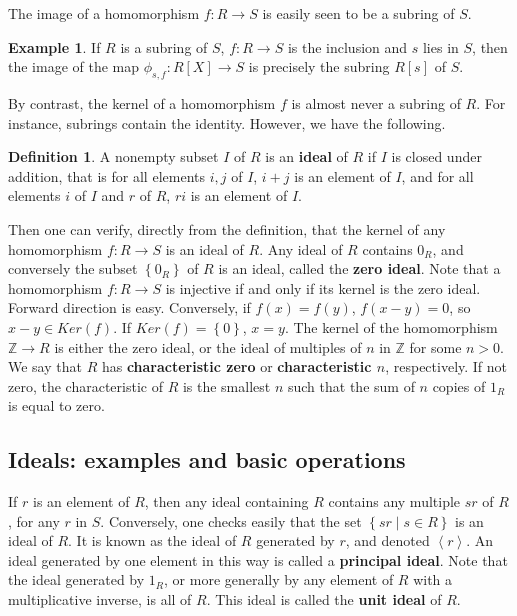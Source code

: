 \documentclass{article}
\newcommand{\Z}{\mathbb{Z}}
\newcommand{\rb}[1]{\left( #1 \right)}
\renewcommand{\sb}[1]{\left[ #1 \right]}
\newcommand{\cb}[1]{\left\{ #1 \right\}}
\newcommand{\ab}[1]{\left\langle #1 \right\rangle}
\theoremstyle{definition}\newtheorem{definition}{Definition}[subsection]
\theoremstyle{definition}\newtheorem{remark}[definition]{Remark}
\theoremstyle{definition}\newtheorem*{example}{Example}
\theoremstyle{definition}\newtheorem*{note}{Note}
\begin{document}
The image of a homomorphism $ f : R \to S $ is easily seen to be a subring of $ S $.

\begin{example}
If $ R $ is a subring of $ S $, $ f : R \to S $ is the inclusion and $ s $ lies in $ S $, then the image of the map $ \phi_{s, f} : R\sb{X} \to S $ is precisely the subring $ R\sb{s} $ of $ S $.
\end{example}

By contrast, the kernel of a homomorphism $ f $ is almost never a subring of $ R $. For instance, subrings contain the identity. However, we have the following.


\begin{definition}
A nonempty subset $ I $ of $ R $ is an \textbf{ideal} of $ R $ if $ I $ is closed under addition, that is for all elements $ i, j $ of $ I $, $ i + j $ is an element of $ I $, and for all elements $ i $ of $ I $ and $ r $ of $ R $, $ ri $ is an element of $ I $.
\end{definition}

Then one can verify, directly from the definition, that the kernel of any homomorphism $ f : R \to S $ is an ideal of $ R $. Any ideal of $ R $ contains $ 0_R $, and conversely the subset $ \cb{0_R} $ of $ R $ is an ideal, called the \textbf{zero ideal}. Note that a homomorphism $ f : R \to S $ is injective if and only if its kernel is the zero ideal. Forward direction is easy. Conversely, if $ f\rb{x} = f\rb{y} $, $ f\rb{x - y} = 0 $, so $ x - y \in Ker\rb{f} $. If $ Ker\rb{f} = \cb{0} $, $ x = y $. The kernel of the homomorphism $ \Z \to R $ is either the zero ideal, or the ideal of multiples of $ n $ in $ \Z $ for some $ n > 0 $. We say that $ R $ has \textbf{characteristic zero} or \textbf{characteristic $ n $}, respectively. If not zero, the characteristic of $ R $ is the smallest $ n $ such that the sum of $ n $ copies of $ 1_R $ is equal to zero.

\subsection{Ideals: examples and basic operations}

If $ r $ is an element of $ R $, then any ideal containing $ R $ contains any multiple $ sr $ of $ R $, for any $ r $ in $ S $. Conversely, one checks easily that the set $ \cb{sr \mid s \in R} $ is an ideal of $ R $. It is known as the ideal of $ R $ generated by $ r $, and denoted $ \ab{r} $. An ideal generated by one element in this way is called a \textbf{principal ideal}. Note that the ideal generated by $ 1_R $, or more generally by any element of $ R $ with a multiplicative inverse, is all of $ R $. This ideal is called the \textbf{unit ideal} of $ R $.
\end{document}
